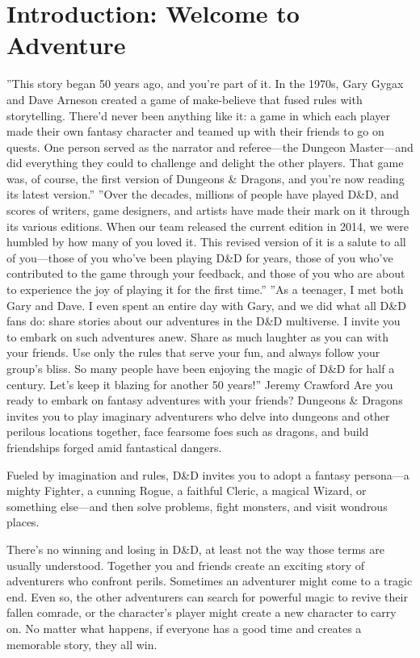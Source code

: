 \documentclass[10pt,a4paper,twoside,bg=print,twocolumn,openany,nodeprecatedcode]{dndbook}
\date{}
\begin{document}
\frontmatter
\tableofcontents
\mainmatter
{}
\chapter*{Introduction: Welcome to Adventure}
\DndQuote%
{}
{''This story began 50 years ago, and you're part of it. In the 1970s, Gary Gygax and Dave Arneson created a game of make-believe that fused rules with storytelling. There'd never been anything like it: a game in which each player made their own fantasy character and teamed up with their friends to go on quests. One person served as the narrator and referee—the Dungeon Master—and did everything they could to challenge and delight the other players. That game was, of course, the first version of Dungeons \& Dragons, and you're now reading its latest version.''}
{''Over the decades, millions of people have played D\&D, and scores of writers, game designers, and artists have made their mark on it through its various editions. When our team released the current edition in 2014, we were humbled by how many of you loved it. This revised version of it is a salute to all of you—those of you who've been playing D\&D for years, those of you who've contributed to the game through your feedback, and those of you who are about to experience the joy of playing it for the first time.''}
{''As a teenager, I met both Gary and Dave. I even spent an entire day with Gary, and we did what all D\&D fans do: share stories about our adventures in the D\&D multiverse. I invite you to embark on such adventures anew. Share as much laughter as you can with your friends. Use only the rules that serve your fun, and always follow your group's bliss. So many people have been enjoying the magic of D\&D for half a century. Let's keep it blazing for another 50 years!''}
{Jeremy Crawford}
Are you ready to embark on fantasy adventures with your friends? Dungeons \& Dragons invites you to play imaginary adventurers who delve into dungeons and other perilous locations together, face fearsome foes such as dragons, and build friendships forged amid fantastical dangers.

Fueled by imagination and rules, D\&D invites you to adopt a fantasy persona—a mighty Fighter, a cunning Rogue, a faithful Cleric, a magical Wizard, or something else—and then solve problems, fight monsters, and visit wondrous places.

There's no winning and losing in D\&D, at least not the way those terms are usually understood. Together you and friends create an exciting story of adventurers who confront perils. Sometimes an adventurer might come to a tragic end. Even so, the other adventurers can search for powerful magic to revive their fallen comrade, or the character's player might create a new character to carry on. No matter what happens, if everyone has a good time and creates a memorable story, they all win.
\end{document}
